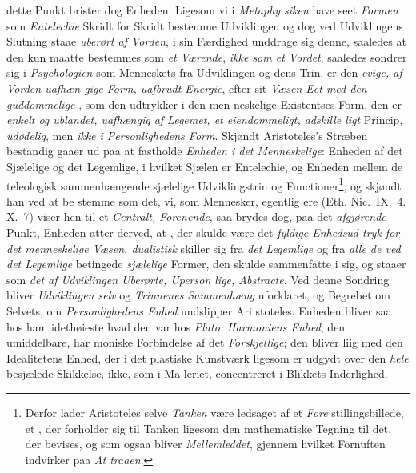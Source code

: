 dette Punkt brister dog Enheden. Ligesom vi i \emph{Metaphy\-%
siken} have seet \emph{Formen} som \emph{Entelechie} Skridt for Skridt
bestemme Udviklingen og dog ved Udviklingens Slutning staae
\emph{uberørt af Vorden}, i sin Færdighed unddrage sig denne,
saaledes at den kun maatte bestemmes som \emph{et Værende},
\emph{ikke som et Vordet}, saaledes sondrer sig i \emph{Psychologien}
 som Menneskets  fra Udviklingen og dens
Trin.  er den \emph{evige, af Vorden uafhæn\-%
gige Form, uafbrudt Energie}, efter sit \emph{Væsen Eet med
den guddommelige} , som den udtrykker i den men\-%
neskelige Existentses Form, den er \emph{enkelt og ublandet,
uafhængig af Legemet, et eiendommeligt, adskille\-%
ligt} Princip, \emph{udødelig}, men \emph{ikke i Personlighedens
 \setcounter{footnote}{0}
Form}. Skjøndt Aristoteles's Stræben bestandig gaaer ud paa
at fastholde \emph{Enheden i det Menneskelige}: Enheden af det
Sjælelige og det Legemlige, i hvilket Sjælen er Entelechie, og
Enheden mellem de teleologisk sammenhængende sjælelige
Udviklingstrin og Functioner\footnote{Derfor lader Aristoteles selve
  \emph{Tanken} være ledsaget af et \emph{Fore\-}%
stillingsbillede, et , der forholder sig til Tanken ligesom
  den mathematiske Tegning til det, der bevises, og som ogsaa bliver
  \emph{Mellemleddet}, gjennem hvilket Fornuften indvirker paa \emph{At\-%
traaen}.}, og skjøndt han ved at be\-%
stemme  som det, vi, som Mennesker, egentlig ere (Eth.
Nic.\ IX.\ 4. X.\ 7) viser hen til et \emph{Centralt, Forenende},
saa brydes dog, paa det \emph{afgjørende} Punkt, Enheden atter
derved, at , der skulde være det \emph{fyldige Enhedsud\-%
tryk for det menneskelige Væsen, dualistisk} skiller
sig fra \emph{det Legemlige} og fra \emph{alle de ved det Legemlige}
betingede \emph{sjælelige} Former, den skulde sammenfatte i sig,
og staaer som \emph{det af Udviklingen Uberørte, Uperson\-%
lige, Abstracte}. Ved denne Sondring bliver \emph{Udviklingen
selv} og \emph{Trinnenes Sammenhæng} uforklaret, og Begrebet
om Selvets, om \emph{Personlighedens Enhed} undslipper Ari\-%
stoteles. Enheden bliver saa hos ham idethøieste hvad den
var hos \emph{Plato: Harmoniens Enhed}, den umiddelbare, har\-%
moniske Forbindelse af det \emph{Forskjellige}; den bliver liig med
den Idealitetens Enhed, der i det plastiske Kunstværk ligesom
er udgydt over den \emph{hele} besjælede Skikkelse, ikke, som i Ma\-%
leriet, concentreret i Blikkets Inderlighed.

